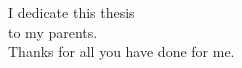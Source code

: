 
\begin{dedication}
\null\vfil
{\large
\begin{center}
I dedicate this thesis  \\\vspace{12pt}
to my parents.\\\vspace{12pt}
Thanks for all you have done for me.
\end{center}}
\vfil\null
\end{dedication}
